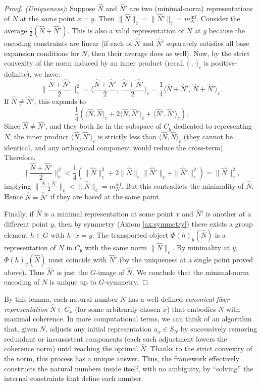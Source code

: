 \documentclass[11pt]{article}
\begin{document}
\begin{proof}
\emph{(Uniqueness)}: Suppose $\hat{N}$ and $\hat{N}'$ are two (minimal-norm) representations of $N$ at the \emph{same} point $x=y$. Then $\|\hat{N}\|_c = \|\hat{N}'\|_c = m_N^{\inf}$. Consider the average $\frac{1}{2}(\hat{N} + \hat{N}')$. This is also a valid representation of $N$ at $y$ because the encoding constraints are linear (if each of $\hat{N}$ and $\hat{N}'$ separately satisfies all base expansion conditions for $N$, then their average does as well). Now, by the strict convexity of the norm induced by an inner product (recall $\langle\cdot,\cdot\rangle_c$ is positive-definite), we have:
\[ 
\Big\|\frac{\hat{N} + \hat{N}'}{2}\Big\|_c^2 
= \Big\langle \frac{\hat{N}+\hat{N}'}{2},\,\frac{\hat{N}+\hat{N}'}{2}\Big\rangle_c 
= \frac{1}{4}\langle \hat{N}+\hat{N}',\,\hat{N}+\hat{N}'\rangle_c.
\] 
If $\hat{N}\neq \hat{N}'$, this expands to 
\[ \frac{1}{4}\left(\langle \hat{N},\hat{N}\rangle_c + 2\langle \hat{N},\hat{N}'\rangle_c + \langle \hat{N}',\hat{N}'\rangle_c\right). \] 
Since $\hat{N}\neq \hat{N}'$, and they both lie in the subspace of $C_y$ dedicated to representing $N$, the inner product $\langle \hat{N},\hat{N}'\rangle_c$ is strictly less than $\langle \hat{N},\hat{N}\rangle_c$ (they cannot be identical, and any orthogonal component would reduce the cross-term). Therefore, 
\[ 
\Big\|\frac{\hat{N} + \hat{N}'}{2}\Big\|_c^2 < \frac{1}{4}( \|\hat{N}\|_c^2 + 2\|\hat{N}\|_c\|\hat{N}'\|_c + \|\hat{N}'\|_c^2 ) = \|\hat{N}\|_c^2,
\] 
implying $\|\tfrac{\hat{N}+\hat{N}'}{2}\|_c < \|\hat{N}\|_c = m_N^{\inf}$. But this contradicts the minimality of $\hat{N}$. Hence $\hat{N} = \hat{N}'$ if they are based at the same point.

Finally, if $\hat{N}$ is a minimal representation at some point $x$ and $\hat{N}'$ is another at a different point $y$, then by symmetry (Axiom \ref{ax:symmetry}) there exists a group element $h\in G$ with $h\cdot x = y$. The transported object $\Phi(h)_y(\hat{N})$ is a representation of $N$ in $C_y$ with the same norm $\|\hat{N}\|_c$. By minimality at $y$, $\Phi(h)_y(\hat{N})$ must coincide with $\hat{N}'$ (by the uniqueness at a single point proved above). Thus $\hat{N}'$ is just the $G$-image of $\hat{N}$. We conclude that the minimal-norm encoding of $N$ is unique up to $G$-symmetry. 
\end{proof}

By this lemma, each natural number $N$ has a well-defined \emph{canonical fiber representation} $\hat{N} \in C_x$ (for some arbitrarily chosen $x$) that embodies $N$ with maximal coherence. In more computational terms, we can think of an algorithm that, given $N$, adjusts any initial representation $a_x \in S_N$ by successively removing redundant or inconsistent components (each such adjustment lowers the coherence norm) until reaching the optimal $\hat{N}$. Thanks to the strict convexity of the norm, this process has a unique answer. Thus, the framework effectively constructs the natural numbers inside itself, with no ambiguity, by “solving” the internal constraints that define each number.
\end{document}
